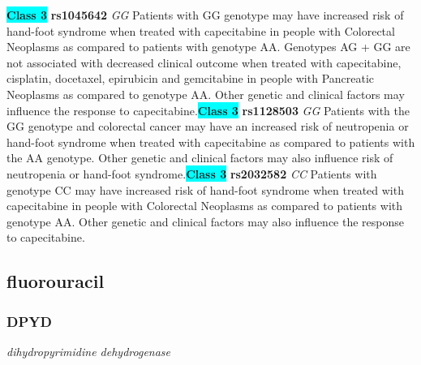 \documentclass{report}
\begin{document}
\textbf{\colorbox{cyan} {Class 3}} \textbf{ rs1045642 } \textit{ GG }
Patients with GG genotype may have increased risk of hand-foot syndrome when treated with capecitabine in people with Colorectal Neoplasms as compared to patients with genotype AA. Genotypes AG + GG are not associated with decreased clinical outcome when treated with capecitabine, cisplatin, docetaxel, epirubicin and gemcitabine in people with Pancreatic Neoplasms as compared to genotype AA. Other genetic and clinical factors may influence the response to capecitabine.\newline\textbf{\colorbox{cyan} {Class 3}} \textbf{ rs1128503 } \textit{ GG }
Patients with the GG genotype and colorectal cancer may have an increased risk of neutropenia or hand-foot syndrome when treated with capecitabine as compared to patients with the AA genotype. Other genetic and clinical factors may also influence risk of neutropenia or hand-foot syndrome.\newline\textbf{\colorbox{cyan} {Class 3}} \textbf{ rs2032582 } \textit{ CC }
Patients with genotype CC may have increased risk of hand-foot syndrome when treated with capecitabine in people with Colorectal Neoplasms as compared to patients with genotype AA. Other genetic and clinical factors may also influence the response to capecitabine.\newline\subsection{ fluorouracil }\subsubsection{ DPYD }
\textit{ dihydropyrimidine dehydrogenase }
\end{document}
